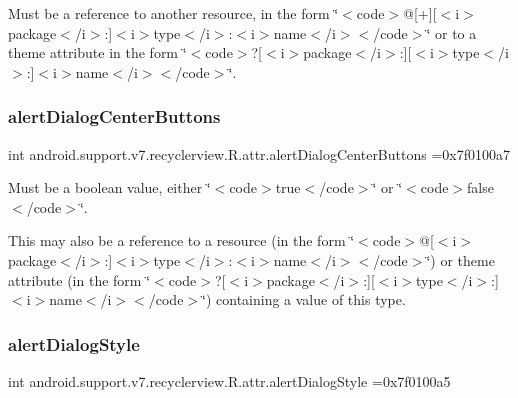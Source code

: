 Must be a reference to another resource, in the form \char`\"{}$<$code$>$@\mbox{[}+\mbox{]}\mbox{[}$<$i$>$package$<$/i$>$\+:\mbox{]}$<$i$>$type$<$/i$>$\+:$<$i$>$name$<$/i$>$$<$/code$>$\char`\"{} or to a theme attribute in the form \char`\"{}$<$code$>$?\mbox{[}$<$i$>$package$<$/i$>$\+:\mbox{]}\mbox{[}$<$i$>$type$<$/i$>$\+:\mbox{]}$<$i$>$name$<$/i$>$$<$/code$>$\char`\"{}. \mbox{\label{classandroid_1_1support_1_1v7_1_1recyclerview_1_1R_1_1attr_a7b4bd2e5aae5728572e06747ec5285ec}} 
\subsubsection{\texorpdfstring{alert\+Dialog\+Center\+Buttons}{alertDialogCenterButtons}}
{\footnotesize\ttfamily int android.\+support.\+v7.\+recyclerview.\+R.\+attr.\+alert\+Dialog\+Center\+Buttons =0x7f0100a7\hspace{0.3cm}{\ttfamily [static]}}

Must be a boolean value, either \char`\"{}$<$code$>$true$<$/code$>$\char`\"{} or \char`\"{}$<$code$>$false$<$/code$>$\char`\"{}. 

This may also be a reference to a resource (in the form \char`\"{}$<$code$>$@\mbox{[}$<$i$>$package$<$/i$>$\+:\mbox{]}$<$i$>$type$<$/i$>$\+:$<$i$>$name$<$/i$>$$<$/code$>$\char`\"{}) or theme attribute (in the form \char`\"{}$<$code$>$?\mbox{[}$<$i$>$package$<$/i$>$\+:\mbox{]}\mbox{[}$<$i$>$type$<$/i$>$\+:\mbox{]}$<$i$>$name$<$/i$>$$<$/code$>$\char`\"{}) containing a value of this type. \mbox{\label{classandroid_1_1support_1_1v7_1_1recyclerview_1_1R_1_1attr_a5c16dbe5885f82cf2317bb1c9cce8741}} 
\subsubsection{\texorpdfstring{alert\+Dialog\+Style}{alertDialogStyle}}
{\footnotesize\ttfamily int android.\+support.\+v7.\+recyclerview.\+R.\+attr.\+alert\+Dialog\+Style =0x7f0100a5\hspace{0.3cm}{\ttfamily [static]}}

